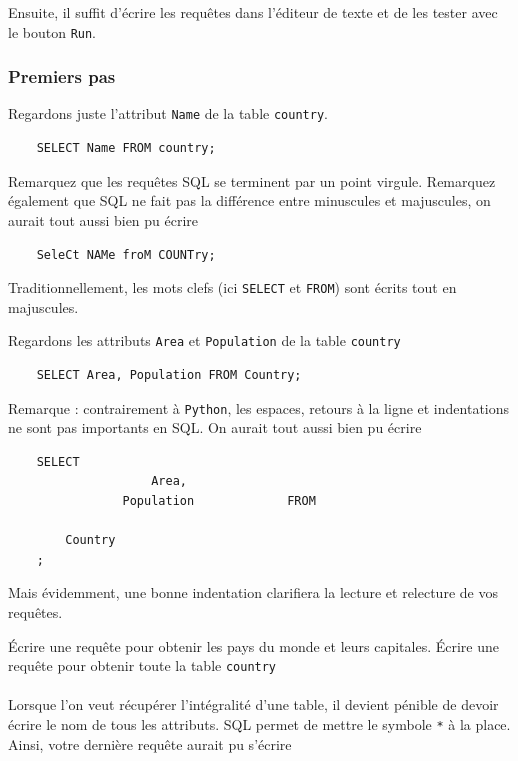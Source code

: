 Ensuite, il suffit d'écrire les requêtes dans l'éditeur de texte et de les tester avec le bouton \texttt{Run}.

\subsubsection{Premiers pas}

Regardons juste l'attribut \texttt{Name} de la table \texttt{country}.

\begin{verbatim}
    SELECT Name FROM country;
\end{verbatim}

Remarquez que les requêtes SQL se terminent par un point virgule. Remarquez également que SQL ne fait pas la différence entre minuscules et majuscules, on aurait tout aussi bien pu écrire

\begin{verbatim}
    SeleCt NAMe froM COUNTry;
\end{verbatim}

Traditionnellement, les mots clefs (ici \texttt{SELECT} et \texttt{FROM}) sont écrits tout en majuscules.

Regardons les attributs \texttt{Area} et \texttt{Population} de la table \texttt{country}
\begin{verbatim}
    SELECT Area, Population FROM Country;
\end{verbatim}

Remarque : contrairement à \texttt{Python}, les espaces, retours à la ligne et indentations ne sont pas importants en SQL. On aurait tout aussi bien pu écrire
\begin{verbatim}
    SELECT
                    Area,
                Population             FROM 

        Country
    ;
\end{verbatim}

Mais évidemment, une bonne indentation clarifiera la lecture et relecture de vos requêtes.

\quessques Écrire une requête pour obtenir les pays du monde et leurs capitales.
\ssques Écrire une requête pour obtenir toute la table \texttt{country}

\paragraph*{} Lorsque l'on veut récupérer l'intégralité d'une table, il devient pénible de devoir écrire le nom de tous les attributs. SQL permet de mettre le symbole \texttt{*} à la place. Ainsi, votre dernière requête aurait pu s'écrire


